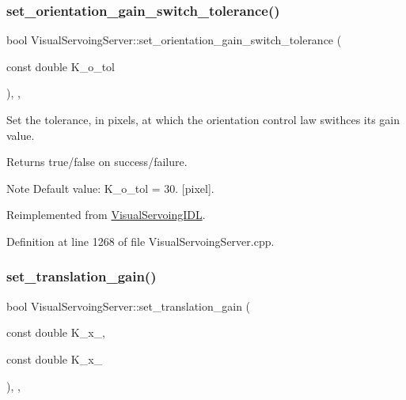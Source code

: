 \subsubsection{\texorpdfstring{set\+\_\+orientation\+\_\+gain\+\_\+switch\+\_\+tolerance()}{set\_orientation\_gain\_switch\_tolerance()}}
{\footnotesize\ttfamily bool Visual\+Servoing\+Server\+::set\+\_\+orientation\+\_\+gain\+\_\+switch\+\_\+tolerance (\begin{DoxyParamCaption}\item[{const double}]{K\+\_\+o\+\_\+tol }\end{DoxyParamCaption})\hspace{0.3cm}{\ttfamily [override]}, {\ttfamily [protected]}, {\ttfamily [virtual]}}



Set the tolerance, in pixels, at which the orientation control law swithces its gain value. 

\begin{DoxyReturn}{Returns}
true/false on success/failure. 
\end{DoxyReturn}
\begin{DoxyNote}{Note}
Default value\+: K\+\_\+o\+\_\+tol = 30. \mbox{[}pixel\mbox{]}. 
\end{DoxyNote}


Reimplemented from \hyperlink{classVisualServoingIDL_acaf4ad7fa8a2443d4719e3f56b8d72b0}{Visual\+Servoing\+I\+DL}.



Definition at line 1268 of file Visual\+Servoing\+Server.\+cpp.

\mbox{\label{classVisualServoingServer_a66324b38d90efb1e68cdfff9fd969487}} 
\subsubsection{\texorpdfstring{set\+\_\+translation\+\_\+gain()}{set\_translation\_gain()}}
{\footnotesize\ttfamily bool Visual\+Servoing\+Server\+::set\+\_\+translation\+\_\+gain (\begin{DoxyParamCaption}\item[{const double}]{K\+\_\+x\+\_,  }\item[{const double}]{K\+\_\+x\+\_ }\end{DoxyParamCaption})\hspace{0.3cm}{\ttfamily [override]}, {\ttfamily [protected]}, {\ttfamily [virtual]}}



